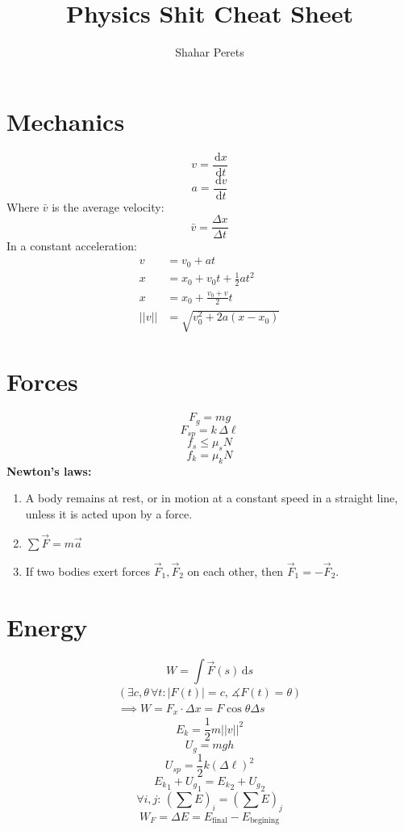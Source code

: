 \documentclass[]{article}
\author{Shahar Perets}
\title{Physics Shit Cheat Sheet}
\newcommand\cost  {\cos \theta}
\newcommand\dx    {\,\mathrm{d}x}
\newcommand\dt    {\,\mathrm{d}t}
\newcommand\ds    {\,\mathrm{d}s}
\newcommand\dv    {\,\mathrm{d}v}
\newcommand\tg        {\theta}
\newcommand\Dg        {\Delta}
\newcommand\co        {\colon}
\newcommand\cl [1]    {\left ( #1 \right )}
\newcommand\norm[1]   {\left \vert \left \vert #1 \right \vert \right \vert}
\begin{document}
	\begin{multicols}{3}
		\section{Mechanics}
		\[ v = \frac{\dx}{\dt} \]
		\[ a = \frac{\dv}{\dt} \]
        Where $\bar v$ is the average velocity:
		\[ \bar v = \frac{\Dg x}{\Dg t} \]
        In a constant acceleration:
		\begin{align*}
			v &= v_0 + at \\
			x &= x_0 + v_0t + \frac{1}{2}at^2 \\
			x &= x_0 + \frac{v_0 + v}{2}t \\
			\norm{v} &= \sqrt{v_0^2 + 2a(x - x_0)} 
		\end{align*}
		
		\section{Forces}
		\[ F_g = mg \]
		\[ F_{sp} = k \, \Dg \ell \]
		\[ f_s \le \mu_s N \]
		\[ f_k = \mu_k N \]
        \textbf{Newton's laws: }
        \begin{enumerate}
            \item A body remains at rest, or in motion at a constant speed in a straight line, unless it is acted upon by a force. 
            \item \hfil $ \sum \vec F = m \vec a $
            \item If two bodies exert forces $\vec F_1, \vec F_2$ on each other, then $\vec F_1 = -\vec F_2$.
        \end{enumerate}
        
		\section{Energy}
		\[ W = \int \vec F(s) \ds \]
		\begin{gather*}
			(\exists c, \tg\, \forall t \co |F(t)| = c, \, \measuredangle F(t) = \tg) \\
			\implies W = F_x \cdot \Dg x = F\cost \Dg s
		\end{gather*}
		\[ E_k = \frac{1}{2}m\norm{v}^2 \]
		\[ U_g = mgh \]
		\[ U_{sp} = \frac{1}{2}k(\Dg \ell)^2 \]
		\[ {E_k}_1 + {U_g}_1 = {E_k}_2 + {U_g}_2 \]
        \[ \textstyle \forall i, j \co \, \cl{\sum E}_i = \cl{\sum E}_j \]
		\[ W_F = \Dg E = E_{\mathrm{final}} - E_{\mathrm{begining}} \]
        
        \columnbreak
		

\end{multicols}
\end{document}
